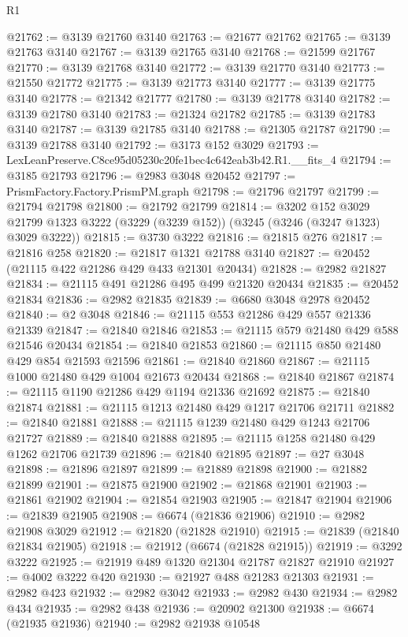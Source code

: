 \begin{lexlean}{R1}
\begin{coremodule}
@21762 := @3139 @21760 @3140
@21763 := @21677 @21762
@21765 := @3139 @21763 @3140
@21767 := @3139 @21765 @3140
@21768 := @21599 @21767
@21770 := @3139 @21768 @3140
@21772 := @3139 @21770 @3140
@21773 := @21550 @21772
@21775 := @3139 @21773 @3140
@21777 := @3139 @21775 @3140
@21778 := @21342 @21777
@21780 := @3139 @21778 @3140
@21782 := @3139 @21780 @3140
@21783 := @21324 @21782
@21785 := @3139 @21783 @3140
@21787 := @3139 @21785 @3140
@21788 := @21305 @21787
@21790 := @3139 @21788 @3140
@21792 := @3173 @152 @3029
@21793 := LexLeanPreserve.C8ce95d05230c20fe1bec4c642eab3b42.R1.__fits_4
@21794 := @3185 @21793
@21796 := @2983 @3048 @20452
@21797 := PrismFactory.Factory.PrismPM.graph
@21798 := @21796 @21797
@21799 := @21794 @21798
@21800 := @21792 @21799
@21814 := @3202
    @152
    @3029
    @21799
    @1323
    @3222
    (@3229 (@3239 @152))
    (@3245 (@3246 (@3247 @1323) @3029 @3222))
@21815 := @3730 @3222
@21816 := @21815 @276
@21817 := @21816 @258
@21820 := @21817 @1321 @21788 @3140
@21827 := @20452 (@21115 @422 @21286 @429 @433 @21301 @20434)
@21828 := @2982 @21827
@21834 := @21115 @491 @21286 @495 @499 @21320 @20434
@21835 := @20452 @21834
@21836 := @2982 @21835
@21839 := @6680 @3048 @2978 @20452
@21840 := @2 @3048
@21846 := @21115 @553 @21286 @429 @557 @21336 @21339
@21847 := @21840 @21846
@21853 := @21115 @579 @21480 @429 @588 @21546 @20434
@21854 := @21840 @21853
@21860 := @21115 @850 @21480 @429 @854 @21593 @21596
@21861 := @21840 @21860
@21867 := @21115 @1000 @21480 @429 @1004 @21673 @20434
@21868 := @21840 @21867
@21874 := @21115 @1190 @21286 @429 @1194 @21336 @21692
@21875 := @21840 @21874
@21881 := @21115 @1213 @21480 @429 @1217 @21706 @21711
@21882 := @21840 @21881
@21888 := @21115 @1239 @21480 @429 @1243 @21706 @21727
@21889 := @21840 @21888
@21895 := @21115 @1258 @21480 @429 @1262 @21706 @21739
@21896 := @21840 @21895
@21897 := @27 @3048
@21898 := @21896 @21897
@21899 := @21889 @21898
@21900 := @21882 @21899
@21901 := @21875 @21900
@21902 := @21868 @21901
@21903 := @21861 @21902
@21904 := @21854 @21903
@21905 := @21847 @21904
@21906 := @21839 @21905
@21908 := @6674 (@21836 @21906)
@21910 := @2982 @21908 @3029
@21912 := @21820 (@21828 @21910)
@21915 := @21839 (@21840 @21834 @21905)
@21918 := @21912 (@6674 (@21828 @21915))
@21919 := @3292 @3222
@21925 := @21919 @489 @1320 @21304 @21787 @21827 @21910
@21927 := @4002 @3222 @420
@21930 := @21927 @488 @21283 @21303
@21931 := @2982 @423
@21932 := @2982 @3042
@21933 := @2982 @430
@21934 := @2982 @434
@21935 := @2982 @438
@21936 := @20902 @21300
@21938 := @6674 (@21935 @21936)
@21940 := @2982 @21938 @10548

\end{coremodule}
\end{lexlean}
